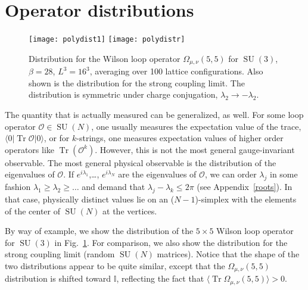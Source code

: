 \documentclass[preprint,aps,prd]{revtex4-2}
\newcommand\wilson[4]{\Omega_{#1, #2}\left(#3,#4\right)}
\DeclareMathOperator{\SU}{SU}
\DeclareMathOperator{\Tr}{Tr}
\begin{document}
\section{Operator distributions}

\begin{figure}
  \texttt{[image: polydist1]}
  \texttt{[image: polydistr]}
  \caption{Distribution for the Wilson loop operator
    $\wilson{\mu}{\nu}{5}{5}$ for $\SU(3)$, $\beta=28$, $L^3=16^3$,
    averaging over 100 lattice configurations.
    Also shown is the distribution for the strong coupling limit.
    The distribution is
    symmetric under charge conjugation,
    $\lambda_2 \to -\lambda_2$.
   \label{polydist1}}
\end{figure}

The quantity that is actually measured can be generalized, as well.
For some loop operator $\mathcal{O}\in\SU(N)$, one usually
measures the expectation value of the trace,
$\langle 0 | \Tr \mathcal{O} |0\rangle$, or for $k$-strings,
one measures expectation values of higher order operators
like $\Tr\left( \mathcal{O}^k\right)$.
However, this is not the most general gauge-invariant observable.
The most general physical observable is the distribution of the
eigenvalues of $\mathcal{O}$.  If $e^{i\lambda_1}$,\ldots, $e^{i\lambda_N}$
are the eigenvalues of $\mathcal{O}$, we can order $\lambda_j$ in
some fashion $\lambda_1\ge \lambda_2 \ge \ldots$ and demand that
$\lambda_j-\lambda_k\le 2\pi$ (see Appendix~\ref{roots}).
In that case, physically
distinct values lie on an ($N-1$)-simplex with the elements of the
center of $\SU(N)$ at the vertices.

By way of example, we show the distribution of the
$5\times5$ Wilson loop operator for $\SU(3)$ in Fig.~\ref{polydist1}.
For comparison, we also show the distribution for
the strong coupling limit (random $\SU(N)$ matrices).
Notice that the shape of the two distributions appear to
be quite similar, except that the $\wilson{\mu}{\nu}{5}{5}$ distribution
is shifted toward $\mathbb{I}$, reflecting the fact that
$\langle\Tr \wilson{\mu}{\nu}{5}{5}\rangle >0$.
\end{document}
